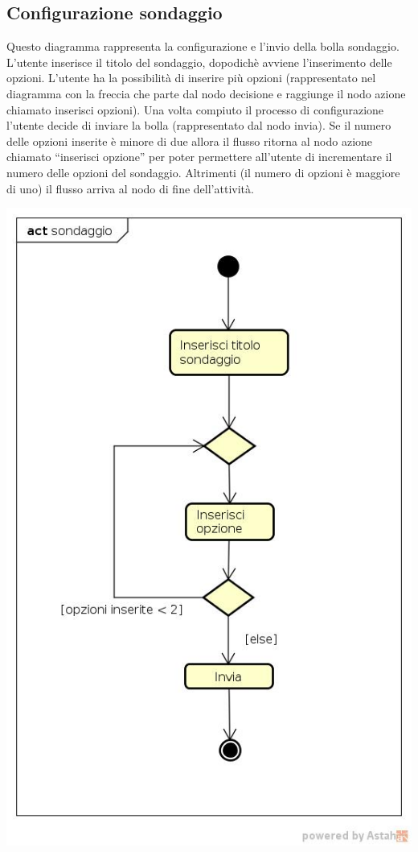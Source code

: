 \subsection{Configurazione sondaggio}
Questo diagramma rappresenta la configurazione e l'invio della bolla
sondaggio. L’utente inserisce il titolo del sondaggio, dopodichè
avviene l’inserimento delle opzioni. L’utente ha la possibilità di
inserire più opzioni (rappresentato nel diagramma con la freccia che
parte dal nodo decisione e raggiunge il nodo azione chiamato inserisci
opzioni). Una volta compiuto il processo di configurazione l’utente
decide di inviare la bolla (rappresentato dal nodo invia). Se il
numero delle opzioni inserite è minore di due allora il flusso ritorna
al nodo azione chiamato “inserisci opzione” per poter permettere
all’utente di incrementare il numero delle opzioni del
sondaggio. Altrimenti (il numero di opzioni è maggiore di uno) il
flusso arriva al nodo di fine dell’attività. 

\begin{center}
  \includegraphics[scale=0.5]{img/Sondaggio.jpg}
\end{center}


